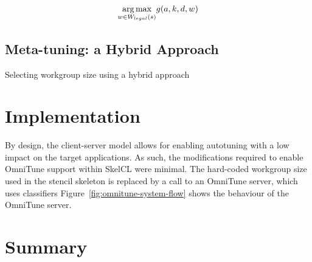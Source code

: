 \begin{equation}
  \underset{w \in W_{legal}(s)}{\operatorname*{arg\,max}} g(a,k,d,w)
\end{equation}

% 


\subsection{Meta-tuning: a Hybrid Approach}


\begin{algorithm}

\caption{Selecting workgroup size using a hybrid approach}
\label{alg:autotune-hybrid}
\end{algorithm}


\section{Implementation}

By design, the client-server model allows for enabling autotuning with
a low impact on the target applications. As such, the modifications
required to enable OmniTune support within SkelCL were minimal. The
hard-coded workgroup size used in the stencil skeleton is replaced by
a call to an OmniTune server, which uses classifiers
Figure~\ref{fig:omnitune-system-flow} shows the behaviour of the
OmniTune server.


\section{Summary}
